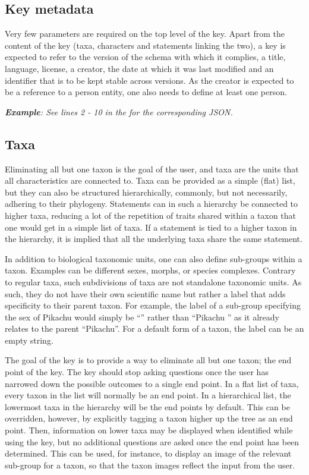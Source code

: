 \documentclass[10pt,letterpaper]{article}
\begin{document}
\subsection*{
Key metadata
}
Very few parameters are required on the top level of the key. Apart from the content of the key (taxa, characters and statements linking the two), a key is expected to refer to the version of the schema with which it complies, a title, language, license, a creator, the date at which it was last modified and an identifier that is to be kept stable across versions. As the creator is expected to be a reference to a person entity, one also needs to define at least one person.

\textit{\textbf{Example}: See lines 2 - 10 in the  for the corresponding JSON.}

\subsection*{
Taxa
}
Eliminating all but one taxon is the goal of the user, and taxa are the units that all characteristics are connected to. Taxa can be provided as a simple (flat) list, but they can also be structured hierarchically, commonly, but not necessarily, adhering to their phylogeny. Statements can in such a hierarchy be connected to higher taxa, reducing a lot of the repetition of traits shared within a taxon that one would get in a simple list of taxa. If a statement is tied to a higher taxon in the hierarchy, it is implied that all the underlying taxa share the same statement.

In addition to biological taxonomic units, one can also define sub-groups within a taxon. Examples can be different sexes, morphs, or species complexes. Contrary to regular taxa, such subdivisions of taxa are not standalone taxonomic units. As such, they do not have their own scientific name but rather a label that adds specificity to their parent taxon. For example, the label of a sub-group specifying the sex of Pikachu would simply be ``\Female'' rather than ``Pikachu \Female'' as it already relates to the parent ``Pikachu''. For a default form of a taxon, the label can be an empty string.

The goal of the key is to provide a way to eliminate all but one taxon; the end point of the key.  The key should stop asking questions once the user has narrowed down the possible outcomes to a single end point. In a flat list of taxa, every taxon in the list will normally be an end point. In a hierarchical list, the lowermost taxa in the hierarchy will be the end points by default. This can be overridden, however, by explicitly tagging a taxon higher up the tree as an end point. Then, information on lower taxa may be displayed when identified while using the key, but no additional questions are asked once the end point has been determined. This can be used, for instance, to display an image of the relevant sub-group for a taxon, so that the taxon images reflect the input from the user.
\end{document}
